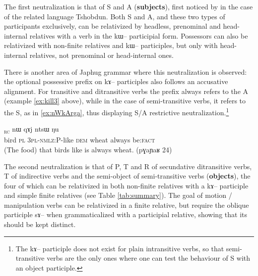 \documentclass[oldfontcommands,oneside,a4paper,11pt]{article}
\newcommand{\ipa}[1]{{\phon #1}} %
\newcommand{\topic}{\textsc{dem}}
\newcommand{\rc}{\textsubscript{\textsc{rc}}}
\begin{document}
The first neutralization is that of S and A (\textbf{subjects}), first noticed by \citet{jackson03caodeng}  in the case of the related language Tshobdun. Both S and A, and these two types of participants exclusively, can be relativized by headless, prenominal and head-internal relatives with a verb in the \ipa{kɯ--} participial form. Possessors can also be relativized with non-finite relatives and \ipa{kɯ--} participles, but only with head-internal relatives, not prenominal or head-internal ones. 


There is another area  of Japhug grammar where this neutralization is observed: the optional possessive prefix on \ipa{kɤ--} participles also follows an accusative alignment.   For transitive and ditransitive verbs  the prefix always refers to the A (example \ref{ex:kill3} above), while in the case of semi-transitive verbs, it refers to the S, as in \ref{ex:nWkArga}, thus displaying S/A restrictive neutralization.\footnote{The \ipa{kɤ--} participle does not exist for plain intransitive verbs, so that semi-transitive verbs are the only ones where one can test the behaviour of S with an object participle.}

 \begin{exe}
   \ex   \label{ex:nWkArga} 
\gll [\ipa{pɣa}  	\ipa{ra}  	\ipa{nɯ-kɤ-rga}]\rc{}  	\ipa{nɯ}  	\ipa{qɤj}  	\ipa{ntsɯ}  	\ipa{ŋu}  \\
bird \textsc{pl} \textsc{3pl-nmlz:P}-like \topic{} wheat always be:\textsc{fact} \\
\glt (The food) that birds like is always wheat. (\ipa{pɣaɲaʁ} 24)
   \end{exe} 


The second neutralization is that of P, T and R of secundative ditransitive verbs, T of indirective verbs and the semi-object of semi-transitive verbs (\textbf{objects}), the four of which can be relativized in both non-finite relatives with a \ipa{kɤ--} participle and simple finite relatives (see Table \ref{tab:summary}). The goal of motion / manipulation verbs can be relativized in a finite relative, but require the oblique participle \ipa{sɤ--} when grammaticalized with a participial relative, showing that its should be kept distinct.
\end{document}
